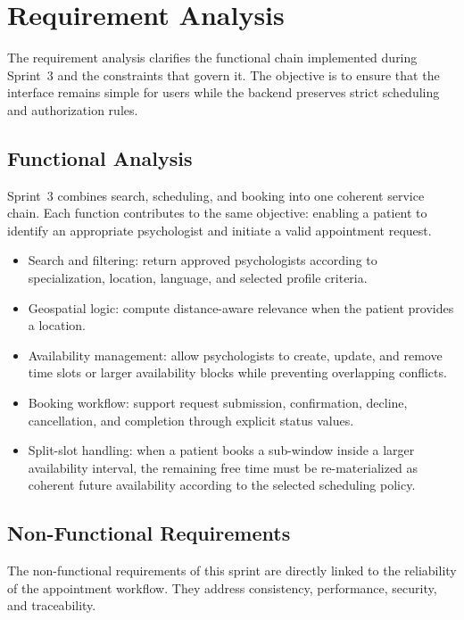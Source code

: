 \documentclass[a4paper,12pt]{report}
\begin{document}
\section{Requirement Analysis}
\label{sec:sprint3-analysis}

The requirement analysis clarifies the functional chain implemented during Sprint~3 and the constraints that govern it. The objective is to ensure that the interface remains simple for users while the backend preserves strict scheduling and authorization rules.

\subsection{Functional Analysis}

Sprint~3 combines search, scheduling, and booking into one coherent service chain. Each function contributes to the same objective: enabling a patient to identify an appropriate psychologist and initiate a valid appointment request.

\begin{itemize}[leftmargin=*]
  \item[--] Search and filtering: return approved psychologists according to specialization, location, language, and selected profile criteria.
  \item[--] Geospatial logic: compute distance-aware relevance when the patient provides a location.
  \item[--] Availability management: allow psychologists to create, update, and remove time slots or larger availability blocks while preventing overlapping conflicts.
  \item[--] Booking workflow: support request submission, confirmation, decline, cancellation, and completion through explicit status values.
  \item[--] Split-slot handling: when a patient books a sub-window inside a larger availability interval, the remaining free time must be re-materialized as coherent future availability according to the selected scheduling policy.
\end{itemize}

\subsection{Non-Functional Requirements}

The non-functional requirements of this sprint are directly linked to the reliability of the appointment workflow. They address consistency, performance, security, and traceability.
\end{document}
